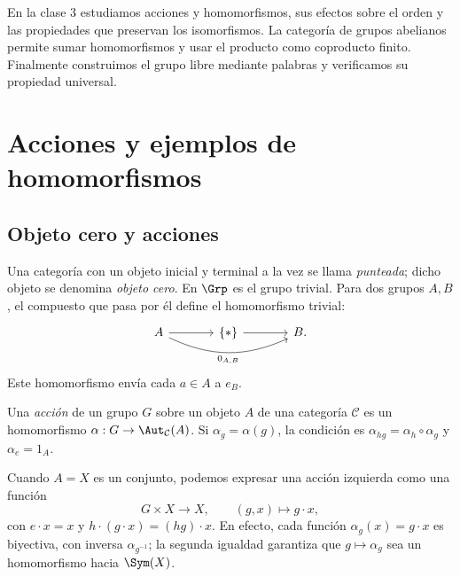 En la clase 3 estudiamos acciones y homomorfismos, sus efectos sobre el orden y las propiedades que preservan los isomorfismos. La categoría de grupos abelianos permite sumar homomorfismos y usar el producto como coproducto finito. Finalmente construimos el grupo libre mediante palabras y verificamos su propiedad universal.

\section{Acciones y ejemplos de homomorfismos}
\subsection{Objeto cero y acciones}
Una categoría con un objeto inicial y terminal a la vez se llama \emph{punteada}; dicho objeto se denomina \emph{objeto cero}. En $\Grp$ es el grupo trivial. Para dos grupos $A,B$, el compuesto que pasa por él define el homomorfismo trivial:
\[
\begin{tikzcd}[column sep=large]
A\arrow[r]\arrow[rr,bend right=25,"0_{A,B}"']&\{*\}\arrow[r]&B.
\end{tikzcd}
\]
Este homomorfismo envía cada $a\in A$ a $e_B$.

\begin{defi}
Una \emph{acción} de un grupo $G$ sobre un objeto $A$ de una categoría $\mathcal C$ es un homomorfismo $\alpha:G\to\Aut_{\mathcal C}(A)$. Si $\alpha_g=\alpha(g)$, la condición es $\alpha_{hg}=\alpha_h\circ\alpha_g$ y $\alpha_e=1_A$.
\end{defi}
Cuando $A=X$ es un conjunto, podemos expresar una acción izquierda como una función
\[
G\times X\to X,\qquad (g,x)\mapsto g\cdot x,
\]
con $e\cdot x=x$ y $h\cdot(g\cdot x)=(hg)\cdot x$. En efecto, cada función $\alpha_g(x)=g\cdot x$ es biyectiva, con inversa $\alpha_{g^{-1}}$; la segunda igualdad garantiza que $g\mapsto\alpha_g$ sea un homomorfismo hacia $\Sym(X)$.

